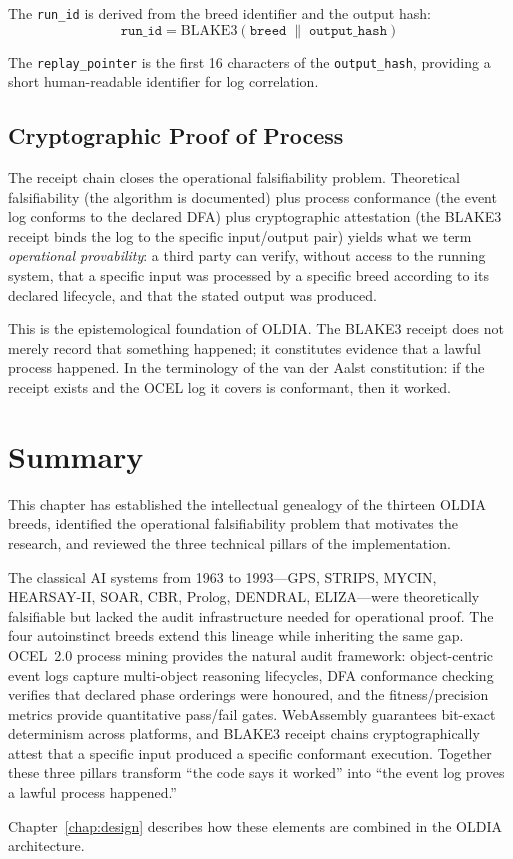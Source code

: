 The \texttt{run\_id} is derived from the breed identifier and the output hash:
\begin{equation}
  \texttt{run\_id} = \mathrm{BLAKE3}(\texttt{breed} \;\|\; \texttt{output\_hash})
  \label{eq:run-id}
\end{equation}

The \texttt{replay\_pointer} is the first 16 characters of the
\texttt{output\_hash}, providing a short human-readable identifier for log
correlation.

\subsection{Cryptographic Proof of Process}
\label{subsec:proof-of-process}

The receipt chain closes the operational falsifiability problem.  Theoretical
falsifiability (the algorithm is documented) plus process conformance (the
event log conforms to the declared DFA) plus cryptographic attestation (the
BLAKE3 receipt binds the log to the specific input/output pair) yields what we
term \emph{operational provability}: a third party can verify, without access
to the running system, that a specific input was processed by a specific breed
according to its declared lifecycle, and that the stated output was produced.

This is the epistemological foundation of OLDIA.  The BLAKE3 receipt does not
merely record that something happened; it constitutes evidence that a lawful
process happened.  In the terminology of the van der Aalst constitution: if the
receipt exists and the OCEL log it covers is conformant, then it worked.

\section{Summary}
\label{sec:background-summary}

This chapter has established the intellectual genealogy of the thirteen OLDIA
breeds, identified the operational falsifiability problem that motivates the
research, and reviewed the three technical pillars of the implementation.

The classical AI systems from 1963 to 1993---GPS, STRIPS, MYCIN, HEARSAY-II,
SOAR, CBR, Prolog, DENDRAL, ELIZA---were theoretically falsifiable but lacked
the audit infrastructure needed for operational proof.  The four autoinstinct
breeds extend this lineage while inheriting the same gap.  OCEL~2.0 process
mining provides the natural audit framework: object-centric event logs capture
multi-object reasoning lifecycles, DFA conformance checking verifies that
declared phase orderings were honoured, and the fitness/precision metrics
provide quantitative pass/fail gates.  WebAssembly guarantees
bit-exact determinism across platforms, and BLAKE3 receipt chains
cryptographically attest that a specific input produced a specific conformant
execution.  Together these three pillars transform ``the code says it worked''
into ``the event log proves a lawful process happened.''

Chapter~\ref{chap:design} describes how these elements are combined in the
OLDIA architecture.
